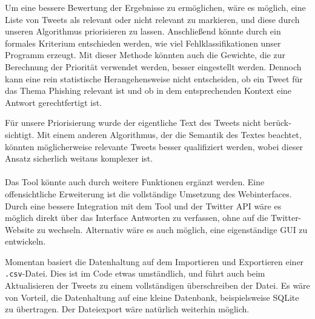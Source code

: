 \documentclass[runningheads]{llncs}
\begin{document}
Um eine bessere Bewertung der Ergebnisse zu ermöglichen, wäre es möglich, eine Liste von Tweets als relevant oder nicht relevant zu markieren, und diese durch unseren Algorithmus priorisieren zu lassen.
Anschließend könnte durch ein formales Kriterium entschieden werden, wie viel Fehlklassifikationen unser Programm erzeugt.
Mit dieser Methode könnten auch die Gewichte, die zur Berechnung der Priorität verwendet werden, besser eingestellt werden.
Dennoch kann eine rein statistische Herangehensweise nicht entscheiden, ob ein Tweet für das Thema Phishing relevant ist und ob in dem entsprechenden Kontext eine Antwort gerechtfertigt ist.

Für unsere Priorisierung wurde der eigentliche Text des Tweets nicht berück-sichtigt.
Mit einem anderen Algorithmus, der die Semantik des Textes beachtet, könnten möglicherweise relevante Tweets besser qualifiziert werden, wobei dieser Ansatz sicherlich weitaus komplexer ist.

\paragraph{} Das Tool könnte auch durch weitere Funktionen ergänzt werden.
Eine offensichtliche Erweiterung ist die vollständige Umsetzung des Webinterfaces.
Durch eine bessere Integration mit dem Tool und der Twitter API wäre es möglich direkt über das Interface Antworten zu verfassen, ohne auf die Twitter-Website zu wechseln.
Alternativ wäre es auch möglich, eine eigenständige GUI zu entwickeln.

Momentan basiert die Datenhaltung auf dem Importieren und Exportieren einer \texttt{.csv}-Datei.
Dies ist im Code etwas umständlich, und führt auch beim Aktualisieren der Tweets zu einem vollständigen überschreiben der Datei.
Es wäre von Vorteil, die Datenhaltung auf eine kleine Datenbank, beispielsweise SQLite zu übertragen.
Der Dateiexport wäre natürlich weiterhin möglich.

%
%

%

\end{document}
